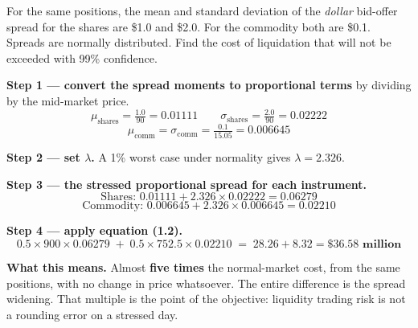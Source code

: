 \begin{lrexbox}
For the same positions, the mean and standard deviation of the \emph{dollar} bid-offer spread for the shares are \$1.0 and \$2.0. For the commodity both are \$0.1. Spreads are normally distributed. Find the cost of liquidation that will not be exceeded with 99\% confidence.

\tcblower
\textbf{Step 1 — convert the spread moments to proportional terms} by dividing by the mid-market price.
\[ \mu_{\text{shares}} = \tfrac{1.0}{90} = 0.01111 \qquad \sigma_{\text{shares}} = \tfrac{2.0}{90} = 0.02222 \]
\[ \mu_{\text{comm}} = \sigma_{\text{comm}} = \tfrac{0.1}{15.05} = 0.006645 \]

\textbf{Step 2 — set $\lambda$.} A 1\% worst case under normality gives $\lambda = 2.326$.

\textbf{Step 3 — the stressed proportional spread for each instrument.}
\[ \text{Shares: } 0.01111 + 2.326 \times 0.02222 = 0.06279 \]
\[ \text{Commodity: } 0.006645 + 2.326 \times 0.006645 = 0.02210 \]

\textbf{Step 4 — apply equation (1.2).}
\[ 0.5 \times 900 \times 0.06279 \;+\; 0.5 \times 752.5 \times 0.02210 \;=\; 28.26 + 8.32 = \mathbf{\$36.58\text{ million}} \]

\textbf{What this means.} Almost \textbf{five times} the normal-market cost, from the same positions, with no change in price whatsoever. The entire difference is the spread widening. That multiple is the point of the objective: liquidity trading risk is not a rounding error on a stressed day.
\end{lrexbox}

